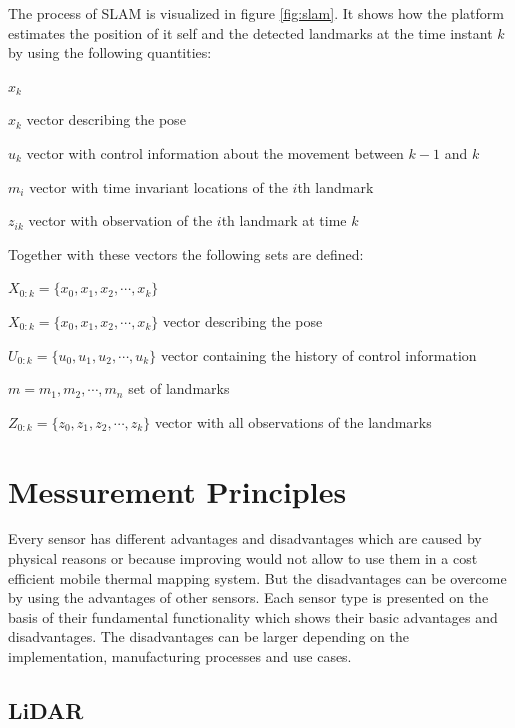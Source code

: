 The process of \ac{SLAM} is visualized in figure \ref{fig:slam}.
It shows how the platform estimates the position of it self and the detected landmarks at the time instant $k$ by using the following quantities\cite{durrant-Whyte2006}:

\begin{labeling}{$x_k$}
	\item[\boldmath$x_k$] vector describing the pose
	\item[\boldmath$u_k$] vector with control information about the movement between $k-1$ and $k$
	\item[\boldmath$m_i$] vector with time invariant locations of the $i$th landmark
	\item[\boldmath$z_{ik}$] vector with observation of the $i$th landmark at time $k$
\end{labeling}

Together with these vectors the following sets are defined:

\begin{labeling}{\boldmath$X_{0:k}=\{x_0, x_1, x_2, \cdots , x_k\}$}
	\item[\boldmath$X_{0:k}=\{x_0, x_1, x_2, \cdots , x_k\}$] vector describing the pose
	\item[\boldmath$U_{0:k}=\{u_0, u_1, u_2, \cdots , u_k\}$] vector containing the history of control information
	\item[\boldmath$m={m_1, m_2, \cdots, m_n}$] set of landmarks
	\item[\boldmath$Z_{0:k}=\{z_0, z_1, z_2, \cdots , z_k\}$] vector with all observations of the landmarks
\end{labeling}



\section{Messurement Principles}\label{sec:messurementPrinciples}
Every sensor has different advantages and disadvantages which are caused by physical reasons or because improving would not allow to use them in a cost efficient mobile thermal mapping system.
But the disadvantages can be overcome by using the advantages of other sensors.
Each sensor type is presented on the basis of their fundamental functionality which shows their basic advantages and disadvantages.
The disadvantages can be larger depending on the implementation, manufacturing processes and use cases.

\subsection{LiDAR}\label{ssec:lidar}

